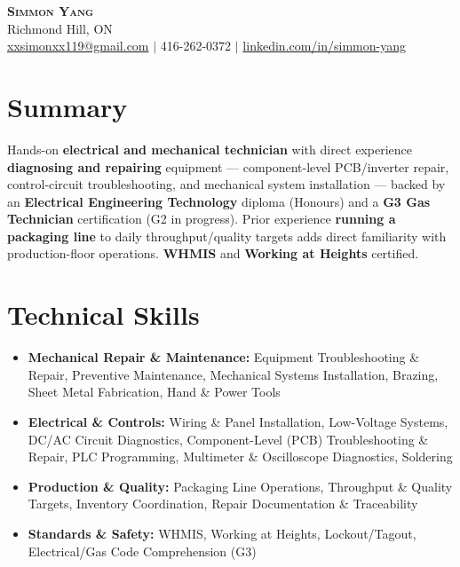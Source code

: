 \documentclass[letterpaper,11pt]{article}
\begin{document}
\begin{center}
    \textbf{\Huge \scshape Simmon Yang} \\ \vspace{1pt}
    Richmond Hill, ON \\
    \href{mailto:xxsimonxx119@gmail.com}{xxsimonxx119@gmail.com} $|$ 416-262-0372 $|$
    \href{https://www.linkedin.com/in/simmon-yang/}{linkedin.com/in/simmon-yang}
\end{center}

\section{Summary}
Hands-on \textbf{electrical and mechanical technician} with direct experience \textbf{diagnosing and repairing} equipment --- component-level PCB/inverter repair, control-circuit troubleshooting, and mechanical system installation --- backed by an \textbf{Electrical Engineering Technology} diploma (Honours) and a \textbf{G3 Gas Technician} certification (G2 in progress). Prior experience \textbf{running a packaging line} to daily throughput/quality targets adds direct familiarity with production-floor operations. \textbf{WHMIS} and \textbf{Working at Heights} certified.

\section{Technical Skills}
\begin{itemize}[leftmargin=0.15in]
  \item \textbf{Mechanical Repair \& Maintenance:} Equipment Troubleshooting \& Repair, Preventive Maintenance, Mechanical Systems Installation, Brazing, Sheet Metal Fabrication, Hand \& Power Tools
  \item \textbf{Electrical \& Controls:} Wiring \& Panel Installation, Low-Voltage Systems, DC/AC Circuit Diagnostics, Component-Level (PCB) Troubleshooting \& Repair, PLC Programming, Multimeter \& Oscilloscope Diagnostics, Soldering
  \item \textbf{Production \& Quality:} Packaging Line Operations, Throughput \& Quality Targets, Inventory Coordination, Repair Documentation \& Traceability
  \item \textbf{Standards \& Safety:} WHMIS, Working at Heights, Lockout/Tagout, Electrical/Gas Code Comprehension (G3)
\end{itemize}
\end{document}
